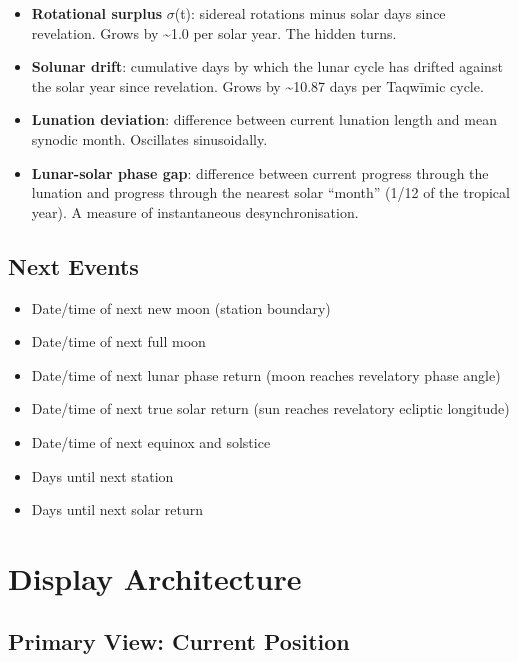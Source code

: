 \begin{itemize}
\tightlist
\item
  \textbf{Rotational surplus} \(\sigma\)(t): sidereal rotations minus solar days since revelation. Grows by \textasciitilde1.0 per solar year. The hidden turns.
\item
  \textbf{Solunar drift}: cumulative days by which the lunar cycle has drifted against the solar year since revelation. Grows by \textasciitilde10.87 days per Taqwīmic cycle.
\item
  \textbf{Lunation deviation}: difference between current lunation length and mean synodic month. Oscillates sinusoidally.
\item
  \textbf{Lunar-solar phase gap}: difference between current progress through the lunation and progress through the nearest solar ``month'' (1/12 of the tropical year). A measure of instantaneous desynchronisation.
\end{itemize}

\hypertarget{next-events}{%
\subsection{Next Events}\label{next-events}}

\begin{itemize}
\tightlist
\item
  Date/time of next new moon (station boundary)
\item
  Date/time of next full moon
\item
  Date/time of next lunar phase return (moon reaches revelatory phase angle)
\item
  Date/time of next true solar return (sun reaches revelatory ecliptic longitude)
\item
  Date/time of next equinox and solstice
\item
  Days until next station
\item
  Days until next solar return
\end{itemize}

\hypertarget{display-architecture}{%
\section{Display Architecture}\label{display-architecture}}

\hypertarget{primary-view-current-position}{%
\subsection{Primary View: Current Position}\label{primary-view-current-position}}

